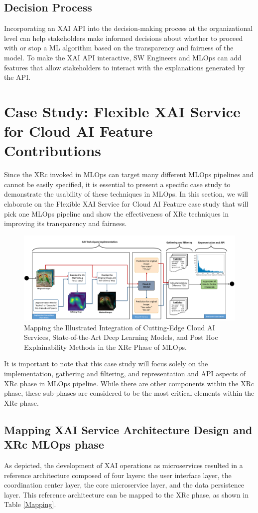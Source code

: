 \documentclass[conference]{IEEEtran}
\begin{document}
\subsection{Decision Process}
Incorporating an XAI API into the decision-making process at the organizational level can help stakeholders make informed decisions about whether to proceed with or stop a ML algorithm based on the transparency and fairness of the model. To make the XAI API interactive, SW Engineers and MLOps can add features that allow stakeholders to interact with the explanations generated by the API.
\section{Case Study: Flexible XAI Service for Cloud AI Feature Contributions}
Since the XRc invoked in MLOps can target many different MLOps pipelines and cannot be easily specified, it is essential to present a specific case study to demonstrate the usability of these techniques in MLOps. In this section, we will elaborate on the Flexible XAI Service for Cloud AI Feature case study that will pick one MLOps pipeline and show the effectiveness of XRc techniques in improving its transparency and fairness.
\begin{figure}[htbp!!]
	\centering
	\includegraphics[width=1.0\textwidth]{XAI_MT.png}
	\caption{Mapping the Illustrated Integration of Cutting-Edge Cloud AI Services, State-of-the-Art Deep Learning Models, and Post Hoc Explainability Methods in the XRc Phase of MLOps.}
	\label{MIICE}
\end{figure}

It is important to note that this case study will focus solely on the implementation, gathering and filtering, and representation and API \cite{TobyAPI} aspects of XRc phase in MLOps pipeline. While there are other components within the XRc phase, these sub-phases are considered to be the most critical elements within the XRc phase.

\subsection{Mapping XAI Service Architecture Design and XRc MLOps phase}
As depicted, the development of XAI operations as microservices resulted in a reference architecture composed of four layers: the user interface layer, the coordination center layer, the core microservice layer, and the data persistence layer. This reference architecture can be mapped to the XRc phase, as shown in Table \ref{Mapping}.
\end{document}
